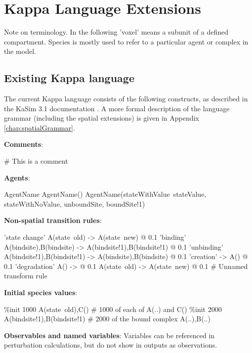 \chapter{Kappa Language Extensions}

Note on terminology. In the following 'voxel' means a subunit of a defined compartment. Species is mostly used to refer to a particular agent or complex in the model.

\section{Existing Kappa language}

The current Kappa language consists of the following constructs, as described in the KaSim 3.1 documentation \citep{KaSimManual2012}. A more formal description of the language grammar (including the spatial extensions) is given in Appendix \ref{chap:spatialGrammar}.

\bigskip 
\textbf{Comments}:

\begin{kappasource}
# This is a comment
\end{kappasource} 

\textbf{Agents}:

\begin{kappasource}
AgentName
AgentName()
AgentName(stateWithValue~stateValue, stateWithNoValue, unboundSite, boundSite!1)
\end{kappasource} 


\textbf{Non-spatial transition rules}:

\begin{kappasource}
'state change' A(state~old) -> A(state~new) @ 0.1
'binding'      A(bindsite),B(bindsite) -> A(bindsite!1),B(bindsite!1) @ 0.1
'unbinding'    A(bindsite!1),B(bindsite!1) -> A(bindsite),B(bindsite) @ 0.1
'creation'     -> A() @ 0.1
'degradation'  A() -> @ 0.1
A(state~old) -> A(state~new) @ 0.1 # Unnamed transform rule
\end{kappasource} 

\textbf{Initial species values}:

\begin{kappasource}
\%init 1000 A(state~old),C()            # 1000 of each of A(..) and C()
\%init 2000 A(bindsite!1),B(bindsite!1) # 2000 of the bound complex A(..),B(..)
\end{kappasource} 

\textbf{Observables and named variables}: Variables can be referenced in perturbation calculations, but do not show in outputs as observations.

